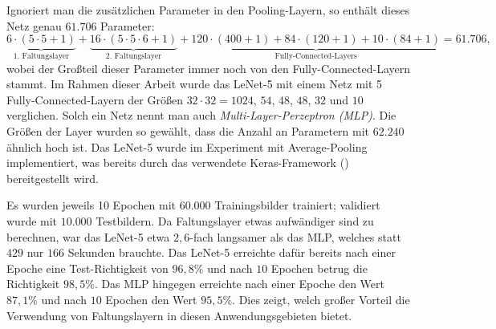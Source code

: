 \documentclass[paper=a4, 	%
		fontsize=11pt,
		abstract=true, 	%
		headsepline, 	%
		notitlepage	%
		]{scrartcl}
\theoremstyle{definition}
\begin{document}
Ignoriert man die zusätzlichen Parameter in den Pooling-Layern, so enthält dieses Netz genau $61{.}706$ Parameter:
\[
    \underbrace{6\cdot (5\cdot 5 + 1)}_{\text{1. Faltungslayer}} + 
    \underbrace{16\cdot (5\cdot 5\cdot 6 + 1)}_{\text{2. Faltungslayer}}  + 
    \underbrace{120\cdot(400+1) + 84\cdot(120+1) + 10 \cdot (84+1)}_{\text{Fully-Connected-Layers}}
    = 61{.}706,
\]
wobei der Großteil dieser Parameter immer noch von den Fully-Connected-Layern stammt.
Im Rahmen dieser Arbeit wurde das LeNet-5 mit einem Netz mit 5 Fully-Connected-Layern der Größen $32\cdot 32=1024$, $54$, $48$, $48$, $32$ und $10$ verglichen.
Solch ein Netz nennt man auch \emph{\foreignlanguage{english}{Multi-Layer-Perzeptron} (MLP)}.
Die Größen der Layer wurden so gewählt, dass die Anzahl an Parametern mit $62{.}240$ ähnlich hoch ist.
Das LeNet-5 wurde im Experiment mit Average-Pooling implementiert, was bereits durch das verwendete Keras-Framework (\cite{chollet2015keras}) bereitgestellt wird.

Es wurden jeweils 10 Epochen mit $60{.}000$ Trainingsbilder trainiert; validiert wurde mit $10{.}000$ Testbildern.
Da Faltungslayer etwas aufwändiger sind zu berechnen, war das LeNet-5 etwa $2{,}6$-fach langsamer als das MLP, welches statt $429$ nur $166$ Sekunden brauchte.
Das LeNet-5 erreichte dafür bereits nach einer Epoche eine Test-Richtigkeit von $96{,}8\%$ und nach $10$ Epochen betrug die Richtigkeit $98{,}5\%$.
Das MLP hingegen erreichte nach einer Epoche den Wert $87{,}1\%$ und nach $10$ Epochen den Wert $95{,}5\%$.
Dies zeigt, welch großer Vorteil die Verwendung von Faltungslayern in diesen Anwendungsgebieten bietet.


\clearpage %
\thispagestyle{empty}

\end{document}
